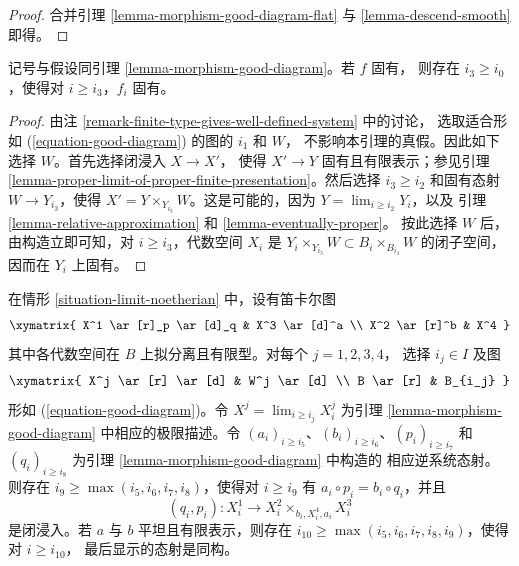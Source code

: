 \begin{proof}
合并引理 \ref{lemma-morphism-good-diagram-flat} 与
\ref{lemma-descend-smooth} 即得。
\end{proof}

\begin{lemma}
\label{lemma-morphism-good-diagram-proper}
记号与假设同引理 \ref{lemma-morphism-good-diagram}。若 $f$ 固有，
则存在 $i_3 \geq i_0$，使得对 $i \geq i_3$，$f_i$ 固有。
\end{lemma}

\begin{proof}
由注 \ref{remark-finite-type-gives-well-defined-system} 中的讨论，
选取适合形如 (\ref{equation-good-diagram}) 的图的 $i_1$ 和 $W$，
不影响本引理的真假。因此如下选择 $W$。首先选择闭浸入 $X \to X'$，
使得 $X' \to Y$ 固有且有限表示；参见引理
\ref{lemma-proper-limit-of-proper-finite-presentation}。然后选择
$i_3 \geq i_2$ 和固有态射 $W \to Y_{i_3}$，使得
$X' = Y \times_{Y_{i_3}} W$。这是可能的，因为
$Y = \lim_{i \geq i_2} Y_i$，以及 %
引理 \ref{lemma-relative-approximation} 和 \ref{lemma-eventually-proper}。
按此选择 $W$ 后，由构造立即可知，对 $i \geq i_3$，代数空间 $X_i$ 是
$Y_i \times_{Y_{i_3}} W \subset B_i \times_{B_{i_3}} W$ 的闭子空间，
因而在 $Y_i$ 上固有。
\end{proof}

\begin{lemma}
\label{lemma-good-diagram-fibre-product}
在情形 \ref{situation-limit-noetherian} 中，设有笛卡尔图
$$
\xymatrix{
X^1 \ar[r]_p \ar[d]_q & X^3 \ar[d]^a \\
X^2 \ar[r]^b & X^4
}
$$
其中各代数空间在 $B$ 上拟分离且有限型。对每个 $j = 1, 2, 3, 4$，
选择 $i_j \in I$ 及图
$$
\xymatrix{
X^j \ar[r] \ar[d] & W^j \ar[d] \\
B \ar[r] & B_{i_j}
}
$$
形如 (\ref{equation-good-diagram})。令
$X^j = \lim_{i \geq i_j} X^j_i$ 为引理 %
\ref{lemma-morphism-good-diagram} 中相应的极限描述。令
$(a_i)_{i \geq i_5}$、$(b_i)_{i \geq i_6}$、$(p_i)_{i \geq i_7}$ 和
$(q_i)_{i \geq i_8}$ 为引理 \ref{lemma-morphism-good-diagram} 中构造的
相应逆系统态射。则存在 $i_9 \geq \max(i_5, i_6, i_7, i_8)$，使得对
$i \geq i_9$ 有 $a_i \circ p_i = b_i \circ q_i$，并且
$$
(q_i, p_i) : X^1_i \longrightarrow X^2_i \times_{b_i, X^4_i, a_i} X^3_i
$$
是闭浸入。若 $a$ 与 $b$ 平坦且有限表示，则存在
$i_{10} \geq \max(i_5, i_6, i_7, i_8, i_9)$，使得对 $i \geq i_{10}$，
最后显示的态射是同构。
\end{lemma}

